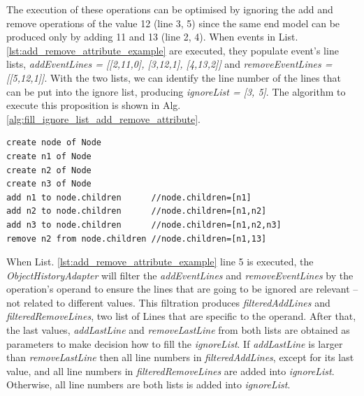 \documentclass[sigconf]{acmart}
\begin{document}
The execution of these operations can be optimised by ignoring the add and remove operations of the value 12 (line 3, 5) since the same end model can be produced only by adding 11 and 13 (line 2, 4). When events in List. \ref{lst:add_remove_attribute_example} are executed, they populate event's line lists, \emph{addEventLines = [[2,11,0], [3,12,1], [4,13,2]]} and \emph{removeEventLines = [[5,12,1]]}. With the two lists, we can identify the line number of the lines that can be put into the ignore list, producing \emph{ignoreList = [3, 5]}. The algorithm to execute this proposition is shown in Alg. \ref{alg:fill_ignore_list_add_remove_attribute}.

\begin{lstlisting}[style=eol,caption={Example of CBP representation of attribute \emph{values}'s add and remove operations.},label=lst:add_remove_attribute_object_example]
create node of Node
create n1 of Node
create n2 of Node
create n3 of Node
add n1 to node.children      //node.children=[n1] 
add n2 to node.children      //node.children=[n1,n2] 
add n3 to node.children      //node.children=[n1,n2,n3] 
remove n2 from node.children //node.children=[n1,13] 
\end{lstlisting}

When List. \ref{lst:add_remove_attribute_example} line 5 is executed, the \emph{ObjectHistoryAdapter} will filter the \emph{addEventLines} and \emph{removeEventLines} by the operation's operand to ensure the lines that are going to be ignored are relevant -- not related to different values. This filtration  produces \emph{filteredAddLines} and \emph{filteredRemoveLines}, two list of Lines that are specific to the operand. After that, the last values, \emph{addLastLine} and \emph{removeLastLine} from both lists are obtained as parameters to make decision how to fill the \emph{ignoreList}. If \emph{addLastLine} is larger than \emph{removeLastLine} then all line numbers in \emph{filteredAddLines}, except for its last value, and all line numbers in \emph{filteredRemoveLines} are added into \emph{ignoreList}. Otherwise, all line numbers are both lists is added into \emph{ignoreList}. 
\end{document}
